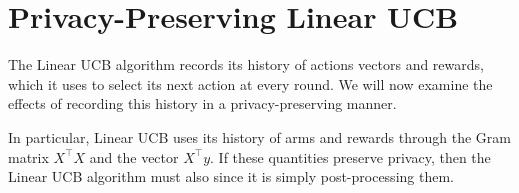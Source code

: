 \documentclass{article}
\newcommand{\defeq}{\coloneq}
\newcommand{\Real}{\mathds{R}}
\newcommand{\mgf}{\mathrm{mgf}}
\DeclarePairedDelimiter{\abs}||
\providecommand\transp{\top}
\let\transpsymbol\transp
\renewcommand{\transp}[1]{#1^\transpsymbol}
\begin{document}
\section{Privacy-Preserving Linear UCB}

The Linear UCB algorithm records its history of actions vectors and
rewards, which it uses to select its next action at every round.  We
will now examine the effects of recording this history in a
privacy-preserving manner.

In particular, Linear UCB uses its history of arms and rewards through
the Gram matrix $\transp{X}X$ and the vector $\transp{X}y$.  If these
quantities preserve privacy, then the Linear UCB algorithm must also
since it is simply post-processing them.

\appendix





\end{document}
